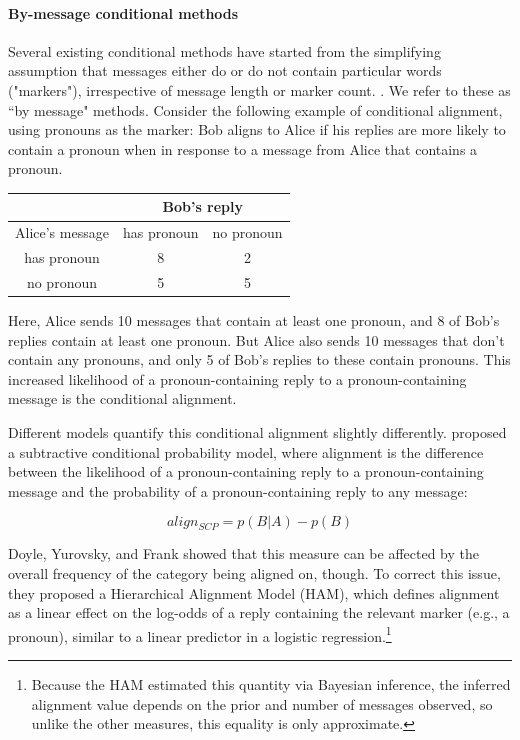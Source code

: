 \documentclass[11pt]{article}
\begin{document}
\paragraph{By-message conditional methods} Several existing conditional methods have started from the simplifying assumption that messages either do or do not contain particular words ("markers"), irrespective of message length or marker count. \cite{DNMEtAl2012,DoyleYurovskyFrank2016}. We refer to these as ``by message" methods. Consider the following example of conditional alignment, using pronouns as the marker: Bob aligns to Alice if his replies are more likely to contain a pronoun when in response to a message from Alice that contains a pronoun.

\begin{center}
\begin{tabular}{|c||c|c|}
\hline
& \multicolumn{2}{|c|}{Bob's reply} \\
\hline
Alice's message & has pronoun & no pronoun \\ \hline
has pronoun & 8 & 2\\
no pronoun & 5 & 5\\
\hline
\end{tabular}
\end{center}

Here, Alice sends 10 messages that contain at least one pronoun, and 8 of Bob's replies contain at least one pronoun.  But Alice also sends 10 messages that don't contain any pronouns, and only 5 of Bob's replies to these contain pronouns. This increased likelihood of a pronoun-containing reply to a pronoun-containing message is the conditional alignment.

Different models quantify this conditional alignment slightly differently.  \cite{DNMGamonDumais2011} proposed a subtractive conditional probability model, where alignment is the difference between the likelihood of a pronoun-containing reply to a pronoun-containing message and the probability of a pronoun-containing reply to any message:

\begin{equation}
align_{SCP} = p(B|A) - p(B)
\end{equation}

Doyle, Yurovsky, and Frank  showed that this measure can be affected by the overall frequency of the category being aligned on, though. To correct this issue, they proposed a Hierarchical Alignment Model (HAM), which defines alignment as a linear effect on the log-odds of a reply containing the relevant marker (e.g., a pronoun), similar to a linear predictor in a logistic regression.\footnote{Because the HAM estimated this quantity via Bayesian inference, the inferred alignment value depends on the prior and number of messages observed, so unlike the other measures, this equality is only approximate.}
\end{document}
